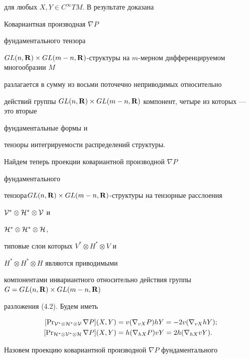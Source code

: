 для любых $X,Y\in C^\infty TM$. В результате доказана


 


\begin{thm} Ковариантная производная $\nabla P$ 


фундаментального тензора 


$GL(n,\bold R)\times GL(m-n,\bold R)$-структуры на $m$-мерном дифференцируемом многообразии $M$ 


разлагается в сумму из восьми поточечно неприводимых относительно 


действий группы $GL(n,\bold R)\times GL(m-n,\bold R)$ компонент, четыре из которых --- это вторые 


фундаментальные формы и 


тензоры интегрируемости распределений структуры. 


\end{thm} 


 


Найдем теперь проекции ковариантной производной $\nabla P$ 


фундаментального 


тензора\linebreak $GL(n,\bold R)\times GL(m-n,\bold R)$-структуры на тензорные расслоения 


$\cal V^*\otimes\cal H^*\otimes\cal V$ и 


$\cal H^*\otimes\cal H^*\otimes\cal H$, 


типовые слои которых $V^*\otimes H^*\otimes V$ и 


$H^*\otimes H^*\otimes H$ являются приводимыми


компонентами инвариантного относительно действия группы $G=GL(n,\bold R)\times GL(m-n,\bold R)$ 


разложения (4.2). Будем иметь 


\begin{align*} 


[\pr_{\cal V^*\otimes\cal H^*\otimes\cal V}\nabla P](X,Y)&= 


v(\nabla_{vX}P)hY=-2v(\nabla_{vX}hY);\\ 


[\pr_{\cal H^*\otimes\cal V^*\otimes\cal H}\nabla P](X,Y)&= 


h(\nabla_{hX}P)vY=2h(\nabla_{hX}vY). 


\end{align*} 


 


Назовем проекцию ковариантной производной $\nabla P$ фундаментального 


